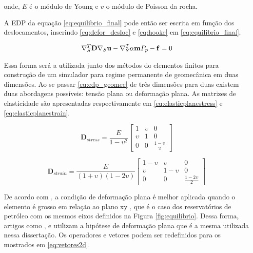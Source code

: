 onde, $E$ é o módulo de Young e $v$ o módulo de Poisson da rocha.


A EDP da equação \eqref{eq:equilibrio_final} pode então ser escrita em função dos deslocamentos, inserindo \eqref{eq:defor_desloc} e \eqref{eq:hooke} em  \eqref{eq:equilibrio_final}.

\begin{equation}
\label{eq:edp_geomec}
\nabla_S^T \mathbf{D} \nabla_S \mathbf{u} - \nabla_S^T\alpha \mathbf{m} P_p - \mathbf{f} = 0
\end{equation}

 Essa forma será a utilizada junto dos métodos do elementos finitos para construção de um simulador para regime permanente de geomecânica em duas dimensões. Ao se passar \eqref{eq:edp_geomec} de três dimensões para duas existem duas abordagens possíveis: tensão plana ou deformação plana. As matrizes de elasticidade são apresentadas respectivamente em \eqref{eq:elasticplanestress} e \eqref{eq:elasticplanestrain}.

\begin{equation} \label{eq:elasticplanestress}
\mathbf{D}_{stress} = \frac{E}{1-\upsilon^2}
\begin{bmatrix}
1  & \upsilon & 0 \\
\upsilon & 1 &  0 \\
0 & 0 & \frac{1-\upsilon}{2}
\end{bmatrix}
\end{equation}

\begin{equation} \label{eq:elasticplanestrain}
\mathbf{D}_{strain} = \frac{E}{(1+\upsilon)(1-2\upsilon)}
\begin{bmatrix}
 1-\upsilon & \upsilon    &  0 \\
 \upsilon   &  1-\upsilon &  0 \\
 0& 0 & \frac{1-2\upsilon}{2}
\end{bmatrix}
\end{equation}

De acordo com \citet{jacob}, a condição de deformação plana é melhor aplicada quando o elemento é grosso em relação ao plano xy , que é o caso dos reservatórios de petróleo com os mesmos eixos definidos na Figura \ref{fig:equilibrio}. Dessa forma, artigos como \cite{casteletto}, \cite{planeStrainProblems} e \cite{irina} utilizam a hipótese de deformação plana que é a mesma utilizada nessa dissertação. Os operadores e vetores podem ser redefinidos para os mostrados em \eqref{eq:vetores2d}.

